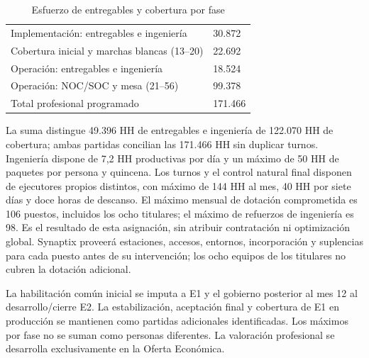 \begin{table}[H]
\centering
\begin{tabularx}{\linewidth}{Y R{25mm}}\hline {} & \\\hline
Implementación: entregables e ingeniería & 30.872\\\hline
Cobertura inicial y marchas blancas (13--20) & 22.692\\\hline
Operación: entregables e ingeniería & 18.524\\\hline
Operación: NOC/SOC y mesa (21--56) & 99.378\\\hline
Total profesional programado & 171.466\\\hline
\end{tabularx}
\caption{Esfuerzo de entregables y cobertura por fase}
\label{tab:sd7-esfuerzo-integral}
\end{table}\par\smallskip

La suma distingue 49.396 HH de entregables e ingeniería de 122.070 HH de cobertura; ambas partidas concilian las 171.466 HH sin duplicar turnos. Ingeniería dispone de 7,2 HH productivas por día y un máximo de 50 HH de paquetes por persona y quincena. Los turnos y el control natural final disponen de ejecutores propios distintos, con máximo de 144 HH al mes, 40 HH por siete días y doce horas de descanso. El máximo mensual de dotación comprometida es 106 puestos, incluidos los ocho titulares; el máximo de refuerzos de ingeniería es 98. Es el resultado de esta asignación, sin atribuir contratación ni optimización global. Synaptix proveerá estaciones, accesos, entornos, incorporación y suplencias para cada puesto antes de su intervención; los ocho equipos de los titulares no cubren la dotación adicional.

La habilitación común inicial se imputa a E1 y el gobierno posterior al mes 12 al desarrollo/cierre E2. La estabilización, aceptación final y cobertura de E1 en producción se mantienen como partidas adicionales identificadas. Los máximos por fase no se suman como personas diferentes. La valoración profesional se desarrolla exclusivamente en la Oferta Económica.




